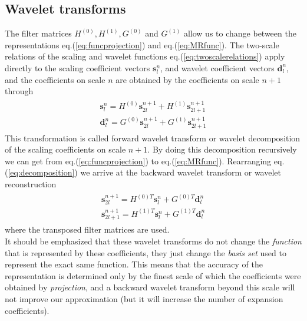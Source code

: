 \subsection*{Wavelet transforms}
The filter matrices $H^{(0)}, H^{(1)}, G^{(0)}$ and $G^{(1)}$ allow us to 
change between the representations eq.(\ref{eq:funcprojection}) and
eq.(\ref{eq:MRfunc}). The two-scale relations of the scaling and wavelet
functions eq.(\ref{eq:twoscalerelations}) apply directly to the scaling 
coefficient vectors $\boldsymbol{s}_l^n$, and wavelet coefficient vectors
$\boldsymbol{d}_l^{n}$, and the coefficients on scale $n$ are obtained by the 
coefficients on scale $n+1$ through
\begin{eqnarray}
	\label{eq:decomposition}
	\begin{split}
	\boldsymbol{s}_l^n = H^{(0)}\boldsymbol{s}_{2l}^{n+1} + 
							  H^{(1)}\boldsymbol{s}_{2l+1}^{n+1}\\
	\boldsymbol{d}_l^n = G^{(0)}\boldsymbol{s}_{2l}^{n+1} + 
							  G^{(1)}\boldsymbol{s}_{2l+1}^{n+1}
	\end{split}
\end{eqnarray}
This transformation is called forward wavelet transform or wavelet 
decomposition of the scaling coefficients on scale $n+1$. By doing this 
decomposition recursively we can get from eq.(\ref{eq:funcprojection}) to 
eq.(\ref{eq:MRfunc}). Rearranging eq.(\ref{eq:decomposition}) we arrive at the
backward wavelet transform or wavelet reconstruction
\begin{eqnarray}
	\label{eq:reconstruction}
	\begin{split}
		\boldsymbol{s}_{2l}^{n+1} = H^{(0)T}\boldsymbol{s}_l^n + 
								   G^{(0)T}\boldsymbol{d}_l^n\\
		\boldsymbol{s}_{2l+1}^{n+1} = H^{(1)T}\boldsymbol{s}_l^n + 
									  G^{(1)T}\boldsymbol{d}_l^n
	\end{split}
\end{eqnarray}
where the transposed filter matrices are used.\\

\noindent
It should be emphasized that these wavelet transforms do not change
the \emph{function} that is represented by these coefficients, they just
change the \emph{basis set} used to represent the exact same function.
This means that the accuracy of the representation is determined only by the 
finest scale of which the coefficients were obtained by \emph{projection}, and 
a backward wavelet transform beyond this scale will not improve our
approximation (but it will increase the number of expansion coefficients).\\

